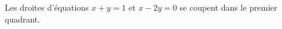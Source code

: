 Les droites d'équations $x+y=1$ et $x-2y=0$ se coupent dans le premier quadrant.

\begin{reponses}
\end{reponses}

